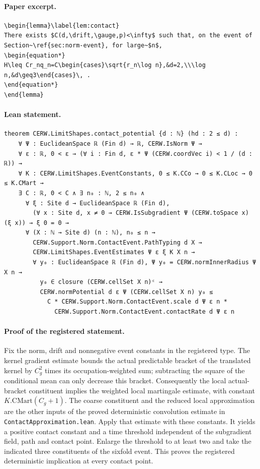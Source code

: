 \paragraph{Paper excerpt.}
\begin{verbatim}
\begin{lemma}\label{lem:contact}
There exists $C(d,\drift,\gauge,p)<\infty$ such that, on the event of Section~\ref{sec:norm-event}, for large~$n$,
\begin{equation*}
H\leq Cr_nq_n=C\begin{cases}\sqrt{r_n\log n},&d=2,\\\log n,&d\geq3\end{cases}\, .
\end{equation*}
\end{lemma}
\end{verbatim}
\paragraph{Lean statement.}
\begin{verbatim}
theorem CERW.LimitShapes.contact_potential {d : ℕ} (hd : 2 ≤ d) :
    ∀ Ψ : EuclideanSpace ℝ (Fin d) → ℝ, CERW.IsNorm Ψ →
    ∀ ε : ℝ, 0 < ε → (∀ i : Fin d, ε * Ψ (CERW.coordVec i) < 1 / (d : ℝ)) →
    ∀ K : CERW.LimitShapes.EventConstants, 0 ≤ K.CCo → 0 ≤ K.CLoc → 0 ≤ K.CMart →
    ∃ C : ℝ, 0 < C ∧ ∃ n₀ : ℕ, 2 ≤ n₀ ∧
      ∀ ξ : Site d → EuclideanSpace ℝ (Fin d),
        (∀ x : Site d, x ≠ 0 → CERW.IsSubgradient Ψ (CERW.toSpace x) (ξ x)) → ξ 0 = 0 →
      ∀ (X : ℕ → Site d) (n : ℕ), n₀ ≤ n →
        CERW.Support.Norm.ContactEvent.PathTyping d X →
        CERW.LimitShapes.EventEstimates Ψ ε ξ K X n →
        ∀ y₀ : EuclideanSpace ℝ (Fin d), Ψ y₀ = CERW.normInnerRadius Ψ X n →
          y₀ ∈ closure (CERW.cellSet X n)ᶜ →
          CERW.normPotential d ε Ψ (CERW.cellSet X n) y₀ ≤
            C * CERW.Support.Norm.ContactEvent.scale d Ψ ε n *
              CERW.Support.Norm.ContactEvent.contactRate d Ψ ε n
\end{verbatim}
\paragraph{Proof of the registered statement.}
Fix the norm, drift and nonnegative event constants in the registered type.
The kernel gradient estimate bounds the actual predictable bracket of the
translated kernel by $C_g^2$ times its occupation-weighted sum; subtracting
the square of the conditional mean can only decrease this bracket.
Consequently the local actual-bracket constituent implies the weighted local
martingale estimate, with constant $K.\mathrm{CMart}(C_g+1)$.
The coarse constituent and the reduced local approximation are the other
inputs of the proved deterministic convolution estimate in
\texttt{ContactApproximation.lean}. Apply that estimate with these constants.
It yields a positive contact constant and a time threshold independent of
the subgradient field, path and contact point. Enlarge the threshold to at
least two and take the indicated three constituents of the sixfold event.
This proves the registered deterministic implication at every contact point.

